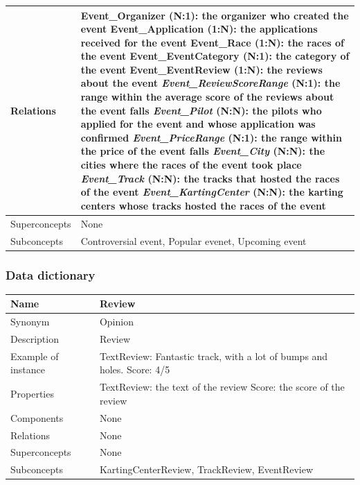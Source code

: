 \documentclass{beamer}
\begin{document}
\begin{frame}
\begin{table}
\tiny
\begin{tabular}{|p{2cm}|p{6cm}|}
\hline
Relations &
Event\_Organizer (N:1): the organizer who created the event \newline
Event\_Application (1:N): the applications received for the event \newline
Event\_Race (1:N): the races of the event \newline
Event\_EventCategory (N:1): the category of the event \newline
Event\_EventReview (1:N): the reviews about the event \newline
\textit{Event\_ReviewScoreRange} (N:1): the range within the average score of the reviews about the event falls \newline
\textit{Event\_Pilot} (N:N): the pilots who applied for the event and whose application was confirmed \newline
\textit{Event\_PriceRange} (N:1): the range within the price of the event falls \newline
\textit{Event\_City} (N:N): the cities where the races of the event took place \newline
\textit{Event\_Track} (N:N): the tracks that hosted the races of the event \newline
\textit{Event\_KartingCenter} (N:N): the karting centers whose tracks hosted the races of the event \\
\hline
Superconcepts & None \\
\hline
Subconcepts & Controversial event, Popular evenet, Upcoming event \\
\hline
\end{tabular}
\end{table}
\end{frame}

\begin{frame}
    \frametitle{Data dictionary}
    \begin{table}
    \tiny
    \begin{tabular}{|p{2cm}|p{6cm}|}
    \hline
    Name & \textbf{Review} \\
    \hline
    Synonym & Opinion \\
    \hline
    Description & Review \\
    \hline
    Example of instance &
    TextReview: Fantastic track, with a lot of bumps and holes. \newline
    Score: 4/5 \\
    \hline
    Properties &
    TextReview: the text of the review \newline
    Score: the score of the review \\
    \hline
    Components & None \\
    \hline
    Relations & None \\
    \hline
    Superconcepts & None \\
    \hline
    Subconcepts & KartingCenterReview, TrackReview, EventReview \\
    \hline
    \end{tabular}
    \end{table}
\end{frame}
\end{document}
